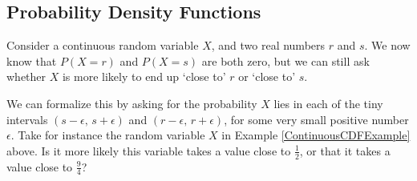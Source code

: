 \subsection*{Probability Density Functions}
Consider a continuous random variable $X$, and two real numbers $r$ and $s$. We now know that $P(X = r)$ and $P(X = s)$ are both zero, but we can still ask whether $X$ is more likely to end up `close to' $r$ or `close to' $s$.
\par
We can formalize this by asking for the probability $X$ lies in each of the tiny intervals $(s-\epsilon,\, s + \epsilon)$ and $(r-\epsilon, \,r+ \epsilon)$, for some very small positive number $\epsilon$. Take for instance the random variable $X$ in Example \ref{ContinuousCDFExample} above. Is it more likely this variable takes a value close to $\frac{1}{2}$, or that it takes a value close to $\frac{9}{4}$?

